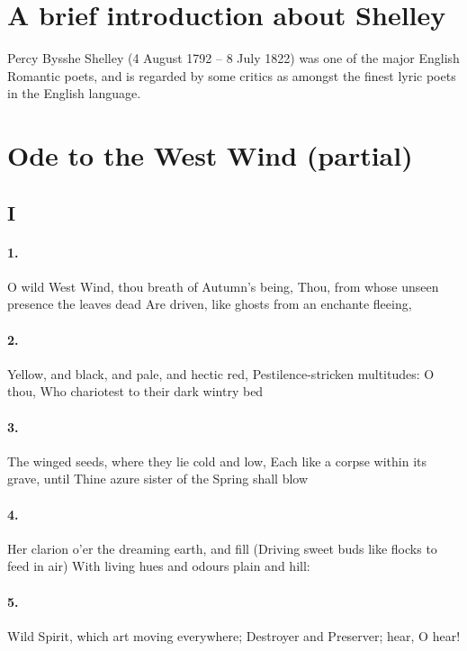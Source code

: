 \documentclass{mockDoc}
\begin{document}
	\section{A brief introduction about Shelley}
		Percy Bysshe Shelley (4 August 1792 -- 8 July 1822) was one of the major English Romantic poets, and is regarded by some critics as amongst the finest lyric poets in the English language. 
	\section{Ode to the West Wind (partial)}
		\subsection{I}
			\paragraph{1.}
				O wild West Wind, thou breath of Autumn's being, \newline 
				Thou, from whose unseen presence the leaves dead \newline 
				Are driven, like ghosts from an enchante fleeing,
			\paragraph{2.}
				Yellow, and black, and pale, and hectic red,\newline 
				Pestilence-stricken multitudes: O thou, \newline	
				Who chariotest to their dark wintry bed
			\paragraph{3.}
				The winged seeds, where they lie cold and low,\newline	
				Each like a corpse within its grave, until \newline
				Thine azure sister of the Spring shall blow
			\paragraph{4.}
				Her clarion o'er the dreaming earth, and fill \newline (Driving sweet buds like flocks to feed in air) \newline With living hues and odours plain and hill:
			\paragraph{5.}
				Wild Spirit, which art moving everywhere; \newline Destroyer and Preserver; hear, O hear!
\end{document}
